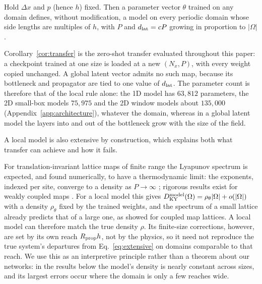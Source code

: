 \begin{corollary}
\label{cor:transfer}
Hold $\Delta x$ and $p$ (hence $h$) fixed. Then a parameter vector
$\theta$ trained on any domain defines, without modification, a model on
every periodic domain whose side lengths are multiples of $h$, with
$P$ and $d_{\mathrm{lat}}=cP$ growing in proportion to $|\Omega|$.
\end{corollary}

Corollary~\ref{cor:transfer} is the zero-shot transfer evaluated
throughout this paper: a checkpoint trained at one size is loaded at a
new $(N_x,P)$, with every weight copied unchanged. A global latent vector
admits no such map, because its bottleneck and propagator are tied to
one value of $d_{\mathrm{lat}}$.
The parameter count is therefore that of the local rule alone: the 1D
model has $63{,}812$ parameters, the 2D small-box models $75{,}975$ and the
2D window models about $135{,}000$ (Appendix~\ref{app:architecture}), whatever the domain, whereas in a global
latent model the layers into and out of the bottleneck grow with the size
of the field.

A local model is also extensive by construction, which explains both
what transfer can achieve and how it fails.

\begin{remark}
\label{rem:extensive_model}
For translation-invariant lattice maps of finite range the Lyapunov
spectrum is expected, and found numerically, to have a thermodynamic
limit: the exponents, indexed per site, converge to a density as
$P\to\infty$
\citep{ruelle1982,livi1986,isola1990}; rigorous results exist for weakly
coupled maps \citep{bunimovichsinai1988}. For a local model this gives
$D_{\mathrm{KY}}^{\text{model}}(\Omega) = \rho_\theta|\Omega| + o(|\Omega|)$ with a
density $\rho_\theta$ fixed by the trained weights, and the spectrum of a
small lattice already predicts that of a large one, as
\citet{carretero1999} showed for coupled map lattices. A local model can
therefore match the true density $\rho$. Its finite-size corrections,
however, are set by its own reach $R_{\mathrm{prop}} h$, not by the physics, so it
need not reproduce the true system's departures from
Eq.~\eqref{eq:extensive} on domains comparable to that reach. We use this
as an interpretive principle rather than a theorem about our networks: in
the results below the model's density is nearly constant across sizes,
and its largest errors occur where the domain is only a few reaches
wide.
\end{remark}

